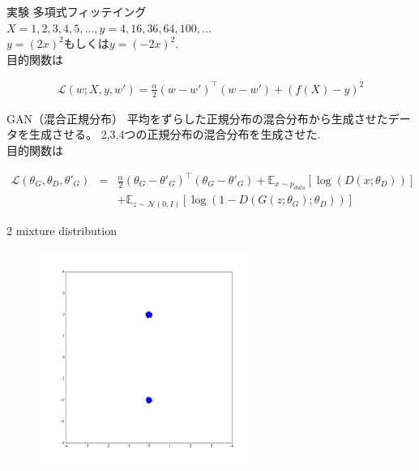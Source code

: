 \documentclass[dvipdfmx,12pt,unicode]{beamer}
\begin{document}
\begin{frame}{実験}
  多項式フィッテイング \\
  $X = {1, 2, 3, 4, 5,...}, y = {4, 16, 36, 64, 100,..}$. \\
  $y = (2x)^{2}$もしくは$y = (-2x)^{2}$. \\
  目的関数は
  
  \begin{eqnarray}
    \label{regression}
    \mathcal{L}(w; X, y, w') =  \frac{\alpha}{2} (w - w')^{\top}(w - w') + (f(X) - y)^{2} 
  \end{eqnarray}      
\end{frame}

\begin{frame}
  GAN（混合正規分布）
  平均をずらした正規分布の混合分布から生成させたデータを生成させる。  
  2,3,4つの正規分布の混合分布を生成させた. \\
  目的関数は
  
  \begin{eqnarray}
    \label{gan}
    \mathcal{L}(\theta_{G}, \theta_{D}, \theta'_{G}) &  = &  \frac{\alpha}{2} (\theta_{G} - \theta'_{G})^{\top}(\theta_{G} - \theta'_{G})   +  \mathbb{E}_{x\sim p_{data}} [ \log(D(x; \theta_{D})) ]   \nonumber \\
    & & + \mathbb{E}_{z\sim \mathcal{N}(0, I)} [ \log(1 - D(G(z;\theta_{G}); \theta_{D})) ]
  \end{eqnarray}        
\end{frame}

\begin{frame}{2 mixture distribution}
  \begin{figure}[htb]
    \begin{center}
      \includegraphics[height=7cm]{2_mixture_true.png}
    \end{center}
  \end{figure}
\end{frame}
\end{document}
